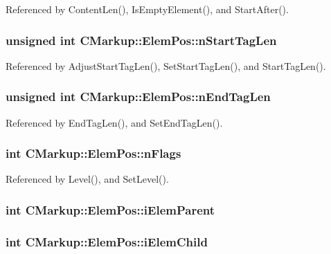 Referenced by ContentLen(), IsEmptyElement(), and StartAfter().
\subsubsection[nStartTagLen]{\setlength{\rightskip}{0pt plus 5cm}unsigned int {\bf CMarkup::ElemPos::nStartTagLen}}\label{structCMarkup_1_1ElemPos_c929700bbc1ec8b928253235dd5038af}




Referenced by AdjustStartTagLen(), SetStartTagLen(), and StartTagLen().
\subsubsection[nEndTagLen]{\setlength{\rightskip}{0pt plus 5cm}unsigned int {\bf CMarkup::ElemPos::nEndTagLen}}\label{structCMarkup_1_1ElemPos_a53ebdfa2aecc621f9cdde9c247d3357}




Referenced by EndTagLen(), and SetEndTagLen().
\subsubsection[nFlags]{\setlength{\rightskip}{0pt plus 5cm}int {\bf CMarkup::ElemPos::nFlags}}\label{structCMarkup_1_1ElemPos_586bb5a2dc7f48ac1417ffd07319a9c9}




Referenced by Level(), and SetLevel().
\subsubsection[iElemParent]{\setlength{\rightskip}{0pt plus 5cm}int {\bf CMarkup::ElemPos::iElemParent}}\label{structCMarkup_1_1ElemPos_e579f35b6cdee1609c6835eddf2b5b03}


\subsubsection[iElemChild]{\setlength{\rightskip}{0pt plus 5cm}int {\bf CMarkup::ElemPos::iElemChild}}\label{structCMarkup_1_1ElemPos_3449b75f915ff4900af177d9a91d91d1}



